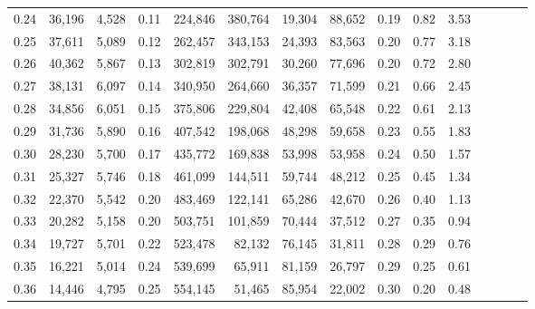 \begin{tabular}{rrrcrrrrrrrrrrr}
0.24 &  36,196 &  4,528 &                                       0.11 &  224,846 &  380,764 &   19,304 &   88,652 &  0.19 &  0.82 &                         3.53 \\
0.25 &  37,611 &  5,089 &                                       0.12 &  262,457 &  343,153 &   24,393 &   83,563 &  0.20 &  0.77 &                         3.18 \\
0.26 &  40,362 &  5,867 &                                       0.13 &  302,819 &  302,791 &   30,260 &   77,696 &  0.20 &  0.72 &                         2.80 \\
0.27 &  38,131 &  6,097 &                                       0.14 &  340,950 &  264,660 &   36,357 &   71,599 &  0.21 &  0.66 &                         2.45 \\
0.28 &  34,856 &  6,051 &                                       0.15 &  375,806 &  229,804 &   42,408 &   65,548 &  0.22 &  0.61 &                         2.13 \\
0.29 &  31,736 &  5,890 &                                       0.16 &  407,542 &  198,068 &   48,298 &   59,658 &  0.23 &  0.55 &                         1.83 \\
0.30 &  28,230 &  5,700 &                                       0.17 &  435,772 &  169,838 &   53,998 &   53,958 &  0.24 &  0.50 &                         1.57 \\
0.31 &  25,327 &  5,746 &                                       0.18 &  461,099 &  144,511 &   59,744 &   48,212 &  0.25 &  0.45 &                         1.34 \\
0.32 &  22,370 &  5,542 &                                       0.20 &  483,469 &  122,141 &   65,286 &   42,670 &  0.26 &  0.40 &                         1.13 \\
0.33 &  20,282 &  5,158 &                                       0.20 &  503,751 &  101,859 &   70,444 &   37,512 &  0.27 &  0.35 &                         0.94 \\
0.34 &  19,727 &  5,701 &                                       0.22 &  523,478 &   82,132 &   76,145 &   31,811 &  0.28 &  0.29 &                         0.76 \\
0.35 &  16,221 &  5,014 &                                       0.24 &  539,699 &   65,911 &   81,159 &   26,797 &  0.29 &  0.25 &                         0.61 \\
0.36 &  14,446 &  4,795 &                                       0.25 &  554,145 &   51,465 &   85,954 &   22,002 &  0.30 &  0.20 &                         0.48 \\

\end{tabular}
